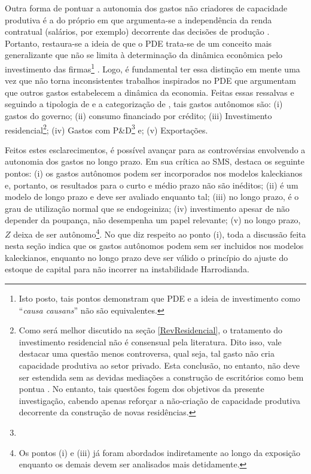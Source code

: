 Outra forma de pontuar a autonomia dos gastos não criadores de capacidade produtiva é a do próprio \textcite{serrano_sraffian_1995} em que argumenta-se a independência da renda contratual (salários, por exemplo) decorrente das decisões de produção .
Portanto, restaura-se a ideia de que o PDE trata-se de um conceito mais generalizante que não se limita à determinação da dinâmica econômica pelo investimento das firmas\footnote{
	Isto posto, tais pontos demonstram que PDE e a ideia de investimento como ``\textit{causa causans}'' não são equivalentes.}
\cite{brochier_macroeconomics_2017}. 
Logo, é fundamental ter essa distinção em mente uma vez que não torna inconsistentes trabalhos inspirados no PDE que argumentam que  outros gastos estabelecem a dinâmica da economia.
Feitas essas ressalvas e seguindo a tipologia de \textcite{cesaratto_technical_2003} e a categorização de \textcite{serrano_sraffian_1995}, tais gastos autônomos são: (i) gastos do governo; (ii) consumo financiado por crédito; (iii) Investimento residencial\footnote{
	Como será melhor discutido na seção \ref{RevResidencial}, o tratamento do investimento residencial não é consensual pela literatura. Dito isso, vale destacar uma questão menos controversa, qual seja, tal gasto não cria capacidade produtiva ao setor privado. Esta conclusão, no entanto, não deve ser estendida sem as devidas mediações a construção de escritórios como bem pontua \textcite{duesenberry_investment_1958}. No entanto, tais questões fogem dos objetivos da presente investigação, cabendo apenas reforçar a não-criação de capacidade produtiva decorrente da construção de novas residências.
}; (iv) Gastos com P\&D\footnote{
} e; (v) Exportações.

Feitos estes esclarecimentos, é possível avançar para as controvérsias envolvendo a autonomia dos gastos no longo prazo. 
Em sua crítica ao SMS, \textcite{nikiforos_comments_2018} destaca os seguinte pontos: 
(i) os gastos autônomos podem ser incorporados nos modelos kaleckianos e, portanto, os resultados para o curto e médio prazo não são inéditos; 
(ii) é um modelo de longo prazo e deve ser avaliado enquanto tal; 
(iii) no longo prazo, é o grau de utilização normal que se endogeiniza; 
(iv) investimento apesar de não depender da poupança, não desempenha um papel relevante; 
(v) no longo prazo, $Z$ deixa de ser autônomo\footnote{Os pontos (i) e (iii) já foram abordados indiretamente ao longo da exposição enquanto os demais devem ser analisados mais detidamente.}.  No que diz respeito ao ponto (i), toda a discussão feita nesta seção indica que os gastos autônomos podem sem ser incluidos nos modelos kaleckianos, enquanto no longo prazo deve ser válido o princípio do ajuste do estoque de capital para não incorrer na instabilidade Harrodianda. 


